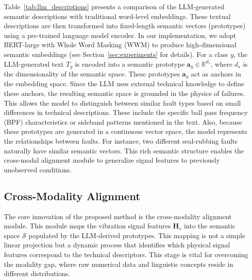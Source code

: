 \documentclass[journal]{IEEEtran}
\begin{document}
Table~\ref{tab:llm_descriptions} presents a comparison of the LLM-generated semantic descriptions with traditional word-level embeddings. These textual descriptions are then transformed into fixed-length semantic vectors (prototypes) using a pre-trained language model encoder. In our implementation, we adopt BERT-large with Whole Word Masking (WWM) \cite{reimers2019sentence} to produce high-dimensional semantic embeddings (see Section~\ref{sec:experiments} for details). For a class $y$, the LLM-generated text $T_y$ is encoded into a semantic prototype $\mathbf{a}_y \in \mathbb{R}^{d_s}$, where $d_s$ is the dimensionality of the semantic space. These prototypes $\mathbf{a}_y$ act as anchors in the embedding space. Since the LLM uses external technical knowledge to define these anchors, the resulting semantic space is grounded in the physics of failures. This allows the model to distinguish between similar fault types based on small differences in technical descriptions. These include the specific ball pass frequency (BPF) characteristics or sideband patterns mentioned in the text. Also, because these prototypes are generated in a continuous vector space, the model represents the relationships between faults. For instance, two different seal-rubbing faults naturally have similar semantic vectors. This rich semantic structure enables the cross-modal alignment module to generalize signal features to previously unobserved conditions.



\subsection{Cross-Modality Alignment}

The core innovation of the proposed method is the cross-modality alignment module. This module maps the vibration signal features $\mathbf{H}_v$ into the semantic space $\mathcal{S}$ populated by the LLM-derived prototypes. This mapping is not a simple linear projection but a dynamic process that identifies which physical signal features correspond to the technical descriptors. This stage is vital for overcoming the modality gap, where raw numerical data and linguistic concepts reside in different distributions.
\end{document}
